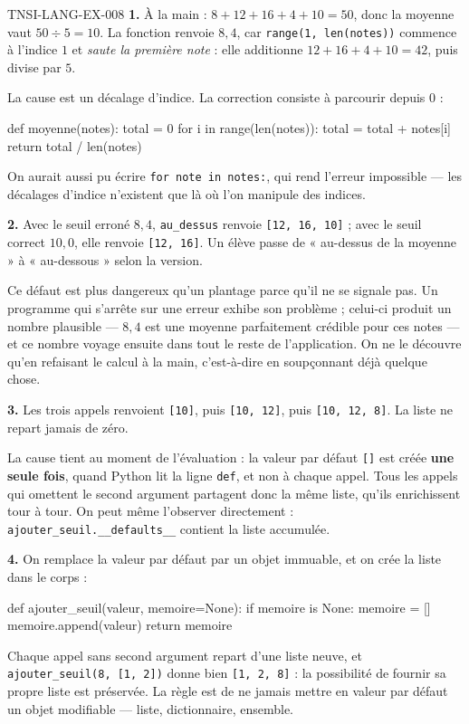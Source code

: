\begin{corrige}{TNSI-LANG-EX-008}
\textbf{1.} À la main : $8+12+16+4+10=50$, donc la moyenne vaut
$50\div 5=10$. La fonction renvoie $8{,}4$, car
\lstinline{range(1, len(notes))} commence à l'indice $1$ et \emph{saute la
première note} : elle additionne $12+16+4+10=42$, puis divise par $5$.

La cause est un décalage d'indice. La correction consiste à parcourir depuis
$0$ :
\begin{python}
def moyenne(notes):
    total = 0
    for i in range(len(notes)):
        total = total + notes[i]
    return total / len(notes)
\end{python}
On aurait aussi pu écrire \lstinline{for note in notes:}, qui rend l'erreur
impossible — les décalages d'indice n'existent que là où l'on manipule des
indices.

\textbf{2.} Avec le seuil erroné $8{,}4$, \lstinline{au_dessus} renvoie
\lstinline{[12, 16, 10]} ; avec le seuil correct $10{,}0$, elle renvoie
\lstinline{[12, 16]}. Un élève passe de « au-dessus de la moyenne » à
« au-dessous » selon la version.

Ce défaut est plus dangereux qu'un plantage parce qu'il ne se signale pas. Un
programme qui s'arrête sur une erreur exhibe son problème ; celui-ci produit un
nombre plausible — $8{,}4$ est une moyenne parfaitement crédible pour ces notes —
et ce nombre voyage ensuite dans tout le reste de l'application. On ne le
découvre qu'en refaisant le calcul à la main, c'est-à-dire en soupçonnant déjà
quelque chose.

\textbf{3.} Les trois appels renvoient \lstinline{[10]}, puis
\lstinline{[10, 12]}, puis \lstinline{[10, 12, 8]}. La liste ne repart jamais de
zéro.

La cause tient au moment de l'évaluation : la valeur par défaut
\lstinline{[]} est créée \textbf{une seule fois}, quand Python lit la ligne
\lstinline{def}, et non à chaque appel. Tous les appels qui omettent le second
argument partagent donc la même liste, qu'ils enrichissent tour à tour. On peut
même l'observer directement : \lstinline{ajouter_seuil.__defaults__} contient la
liste accumulée.

\textbf{4.} On remplace la valeur par défaut par un objet immuable, et on crée la
liste dans le corps :
\begin{python}
def ajouter_seuil(valeur, memoire=None):
    if memoire is None:
        memoire = []
    memoire.append(valeur)
    return memoire
\end{python}
Chaque appel sans second argument repart d'une liste neuve, et
\lstinline{ajouter_seuil(8, [1, 2])} donne bien \lstinline{[1, 2, 8]} : la
possibilité de fournir sa propre liste est préservée. La règle est de ne jamais
mettre en valeur par défaut un objet modifiable — liste, dictionnaire, ensemble.


\end{corrige}
